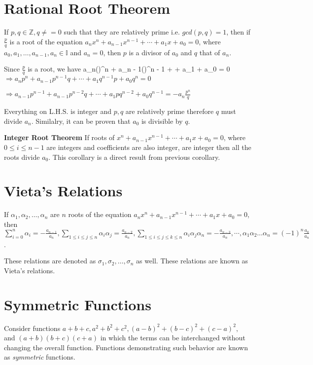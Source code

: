 \section{Rational Root Theorem}
\starttheorem
If $p, q\in\mathbb{Z}, q\neq = 0$ such that they are relatively prime i.e. $gcd(p, q) = 1$, then if
$\frac{p}{q}$ is a root of the equation $a_nx^n + a_{n - 1}x^{n - 1} + \cdots + a_1x + a_0 = 0$, where $a_0,
a_1, \ldots, a_{n - 1}, a_n \in\mathbb{I}$ and $a_n = 0$, then $p$ is a divisor of $a_0$ and $q$ that of
$a_n$.
\stoptheorem

\startproof
  Since $\frac{p}{q}$ is a root, we have
  \startformula a_n\left(\right)^n + a_{n - 1}\left(\right)^{n - 1} + \cdots +
    a_1 + a_0 = 0\stopformula
  $\Rightarrow a_np^n + a_{n - 1}p^{n - 1}q + \cdots + a_1q^{n - 1}p + a_0q^n = 0$

  $\Rightarrow a_{n - 1}p^{n - 1} + a_{n - 1}p^{n - 2}q + \cdots + a_1pq^{n - 2} + a_0q^{n - 1} =
    -a_n\frac{p^n}{q}$

  Everything on L.H.S. is integer and $p, q$ are relatively prime therefore $q$ must divide $a_n$.
  Similalry, it can be proven that $a_0$ is divisible by $q$.
\stopproof

\startcorollary
  {\bf Integer Root Theorem} If roots of $x^n + a_{n - 1}x^{n - 1} + \cdots + a_1x + a_0 = 0$, where $0\leq i\leq n- 1$ are integers
  and coefficients are also integer, are integer then all the roots divide $a_0$.
\stopcorollary
\startproof
  This corollary is a direct result from previous corollary.
\stopproof

\section{Vieta's Relations}
If $\alpha_1, \alpha_2, \ldots, \alpha_n$ are $n$ roots of the equation $a_nx^n + a_{n - 1}x^{n - 1} +
\cdots + a_1x + a_0 = 0$, then $\displaystyle\sum_{i=0}^n\alpha_i = -\frac{a_{n - 1}}{a_n}, \sum_{1\leq
  i\leq j\leq n}\alpha_i\alpha_j = \frac{a_{n - 2}}{a_n}, \sum_{1\leq i\leq j\leq k\leq
  n}\alpha_i\alpha_j\alpha_n = -\frac{a_{n - 3}}{a_n}, \cdots, \alpha_1\alpha_2\ldots\alpha_n =
(-1)^n\frac{a_0}{a_n}$.

These relations are denoted as $\sigma_1, \sigma_2, \ldots, \sigma_n$ as well.
These relations are known as Vieta's relations.

\section{Symmetric Functions}
Consider functions $a + b + c, a^2 + b^2 + c^2, (a - b)^2 + (b - c)^2 + (c - a)^2,$ and $(a + b)(b + c)(c +
a)$ in which the terms can be interchanged without changing the overall function. Functions demonstrating
such behavior are known as {\it symmetric} functions.

